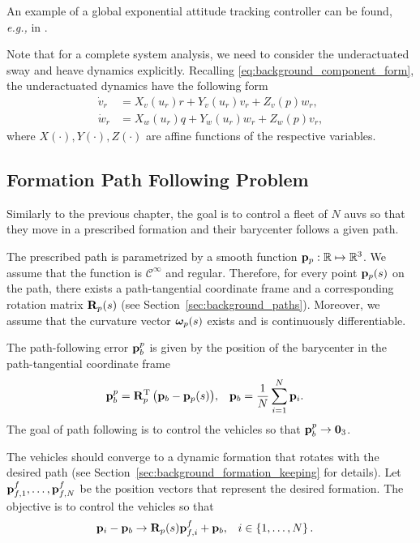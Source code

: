 An example of a global exponential attitude tracking controller can be found, \emph{e.g.,} in \cite{lee_global_2015}.

Note that for a complete system analysis, we need to consider the underactuated sway and heave dynamics explicitly. 
Recalling \eqref{eq:background_component_form}, the underactuated dynamics have the following form 
\begin{subequations}
    \begin{align}
        \dot{v}_r &= X_v(u_r)r + Y_v(u_r)v_r + Z_v(p)w_r, \\
        \dot{w}_r &= X_w(u_r)q + Y_w(u_r)w_r + Z_w(p)v_r,
        \label{eq:NSB_R_underactuated_dynamics}
    \end{align}
\end{subequations}
where $X(\cdot), Y(\cdot), Z(\cdot)$ are affine functions of the respective variables.

\subsection{Formation Path Following Problem}
\label{sec:NSB_R_objectives}

Similarly to the previous chapter, the goal is to control a fleet of $N$ \glspl{auv} so that they move in a prescribed formation and their barycenter follows a given path.

The prescribed path is parametrized by a smooth function $\mathbf{p}_p: \mathbb{R} \mapsto \mathbb{R}^3$.
We assume that the function is $\mathcal{C}^{\infty}$ and regular.
Therefore, for every point $\mathbf{p}_p(s)$ on the path, there exists a path-tangential coordinate frame and a corresponding rotation matrix $\mathbf{R}_p(s)$ (see Section~\ref{sec:background_paths}).
Moreover, we assume that the curvature vector $\bm{\omega}_p(s)$ exists and is continuously differentiable.

The path-following error $\mathbf{p}_b^p$ is given by the position of the barycenter in the path-tangential coordinate frame 
\begin{align}
    \mathbf{p}_b^p &= \mathbf{R}_p^{\mathrm{T}} \, \big(\mathbf{p}_b - \mathbf{p}_p(s)\big), &
    \mathbf{p}_b &= \frac{1}{N} \sum_{i=1}^N \mathbf{p}_i.
    \label{eq:NSB_R_barycenter}
\end{align}
The goal of path following is to control the vehicles so that $\mathbf{p}_b^p \rightarrow \mathbf{0}_3$.

The vehicles should converge to a dynamic formation that rotates with the desired path (see Section~\ref{sec:background_formation_keeping} for details).
Let $\mathbf{p}_{f,1}^f, \ldots, \mathbf{p}_{f,N}^f$ be the position vectors that represent the desired formation.
The objective is to control the vehicles so that
\begin{align}
    \mathbf{p}_i - \mathbf{p}_b &\rightarrow \mathbf{R}_p(s) \mathbf{p}_{f,i}^f + \mathbf{p}_b, &
    i &\in \left\{1, \ldots, N \right\}.
\end{align}

